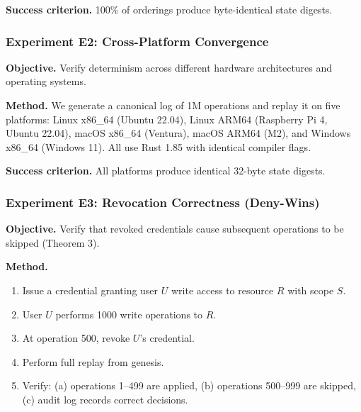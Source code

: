 \textbf{Success criterion.} 100\% of orderings produce byte-identical state digests.



\subsubsection{Experiment E2: Cross-Platform Convergence}
\textbf{Objective.} Verify determinism across different hardware architectures and operating systems.

\textbf{Method.} We generate a canonical log of 1M operations and replay it on five platforms: Linux x86\_64 (Ubuntu 22.04), Linux ARM64 (Raspberry Pi 4, Ubuntu 22.04), macOS x86\_64 (Ventura), macOS ARM64 (M2), and Windows x86\_64 (Windows 11). All use Rust 1.85 with identical compiler flags.

\textbf{Success criterion.} All platforms produce identical 32-byte state digests.



\subsubsection{Experiment E3: Revocation Correctness (Deny-Wins)}
\textbf{Objective.} Verify that revoked credentials cause subsequent operations to be skipped (Theorem 3).

\textbf{Method.}
\begin{enumerate}
    \item Issue a credential granting user $U$ write access to resource $R$ with scope $S$.
    \item User $U$ performs 1000 write operations to $R$.
    \item At operation 500, revoke $U$'s credential.
    \item Perform full replay from genesis.
    \item Verify: (a) operations 1--499 are applied, (b) operations 500--999 are skipped, (c) audit log records correct decisions.
\end{enumerate}

